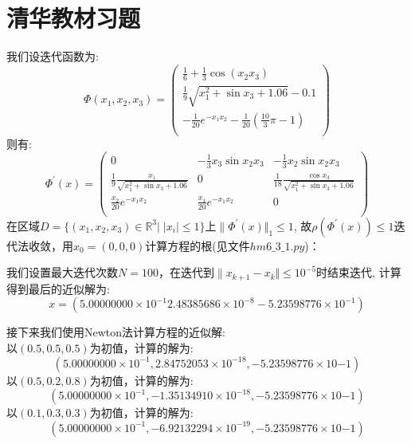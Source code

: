 \documentclass[utf8,a4paper,11pt]{article}
\begin{document}
\section*{清华教材习题}
我们设迭代函数为:
\[
\Phi (x_1,x_2,x_3)=
\begin{pmatrix}
    \frac{1}{6}+\frac{1}{3}\cos(x_2 x_3)\\
    \frac{1}{9} \sqrt{x_1^2 + \sin x_3 +1.06} - 0.1\\
    -\frac{1}{20}e^{-x_1 x_2} - \frac{1}{20}(\frac{10}{3}\pi -1)\\
\end{pmatrix}
\]
则有:
\[
\Phi ^{'}(x)=
\begin{pmatrix}
    0 & -\frac{1}{3}x_3 \sin x_2 x_3 &-\frac{1}{3}x_2 \sin x_2 x_3\\
    \frac{1}{9} \frac{x_1}{\sqrt{x_1^2 + \sin x_3 +1.06}}&0&\frac{1}{18} \frac{\cos x_3}{\sqrt{x_1^2 + \sin x_3 +1.06}}\\
    \frac{x_2}{20} e^{-x_1 x_2}&\frac{x_1}{20} e^{-x_1 x_2}&0\\
\end{pmatrix}    
\]
在区域\(D=\{(x_1,x_2,x_3)\in \mathbb{R}^3 | \;|x_i| \leq 1\}\)上\(\|\Phi^{'}(x)\Vert _1 \leq 1\),
故\(\rho(\Phi^{'}(x)) \leq 1\)迭代法收敛，用\(x_0=(0, 0, 0)\)计算方程的根(见文件\(hm6\_ 3\_1.py\))：

我们设置最大迭代次数\(N=100\)，在迭代到\(\|x_{k+1} - x_{k} \Vert \leq 10^{-5}\)时结束迭代,
计算得到最后的近似解为:\[x = (5.00000000\times 10^{-1}  2.48385686\times 10 ^{-8} -5.23598776\times 10^{-1})\]

接下来我们使用Newton法计算方程的近似解:\\
以\((0.5, 0.5, 0.5)\)为初值，计算的解为:\[(5.00000000\times 10^{-1},2.84752053\times 10^{-18},-5.23598776\times 10{-1})\]
以\((0.5, 0.2, 0.8)\)为初值，计算的解为:\[(5.00000000\times 10^{-1},-1.35134910\times 10^{-18},-5.23598776\times 10{-1})\]
以\((0.1, 0.3, 0.3)\)为初值，计算的解为:\[(5.00000000\times 10^{-1},-6.92132294\times 10^{-19},-5.23598776\times 10{-1})\]
\end{document}
